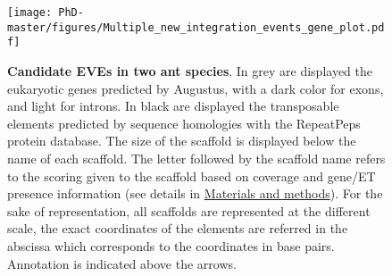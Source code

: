 \begin{figure}[!htpbt]
\texttt{[image: PhD-master/figures/Multiple\_new\_integration\_events\_gene\_plot.pdf]}
\centering
\caption[Paper1:EVE distribution along scaffolds of two ant species]{\textbf{Candidate EVEs in two ant species}. In grey are displayed the eukaryotic genes predicted by Augustus, with a dark color for exons, and light for introns. In black are displayed the transposable elements predicted by sequence homologies with the RepeatPeps protein database. The size of the scaffold is displayed below the name of each scaffold. The letter followed by the scaffold name refers to the scoring given to the scaffold based on coverage and gene/ET presence information (see details in \hyperref[sec:MM-5]{Materials and methods}). For the sake of representation, all scaffolds are represented at the different scale, the exact coordinates of the elements are referred in the abscissa which corresponds to the coordinates in base pairs. Annotation is indicated above the arrows.}
\label{figure:Multiple_new_endogenization_events_gene_plot}
\end{figure}


